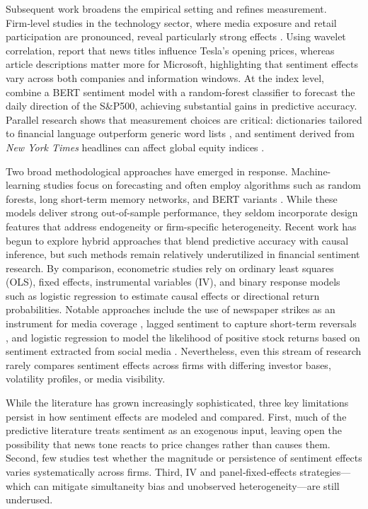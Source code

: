 \documentclass[12pt]{article}
\begin{document}
Subsequent work broadens the empirical setting and refines measurement. Firm‑level studies in the technology sector, where media exposure and retail participation are pronounced, reveal particularly strong effects \citep{cristescu2023wavelet}.  Using wavelet correlation, \citet{cristescu2023wavelet} report that news titles influence Tesla’s opening prices, whereas article descriptions matter more for Microsoft, highlighting that sentiment effects vary across both companies and information windows.  At the index level, \citet{fazlija2022bert} combine a BERT sentiment model with a random‑forest classifier to forecast the daily direction of the S\&P500, achieving substantial gains in predictive accuracy.  Parallel research shows that measurement choices are critical: dictionaries tailored to financial language outperform generic word lists \citep{xiao2023,loughran2011}, and sentiment derived from \textit{New York Times} headlines can affect global equity indices \citep{garcia2018nyt}.

Two broad methodological approaches have emerged in response.  Machine-learning studies focus on forecasting and often employ algorithms such as random forests, long short-term memory networks, and BERT variants \citep{patil2024sentiment,xiao2023}.  While these models deliver strong out-of-sample performance, they seldom incorporate design features that address endogeneity or firm-specific heterogeneity. Recent work has begun to explore hybrid approaches that blend predictive accuracy with causal inference, but such methods remain relatively underutilized in financial sentiment research. By comparison, econometric studies rely on ordinary least squares (OLS), fixed effects, instrumental variables (IV), and binary response models such as logistic regression to estimate causal effects or directional return probabilities.  Notable approaches include the use of newspaper strikes as an instrument for media coverage \citep{engelberg2011causal}, lagged sentiment to capture short-term reversals \citep{tetlock2007giving}, and logistic regression to model the likelihood of positive stock returns based on sentiment extracted from social media \citep{chen2014wisdom}.  Nevertheless, even this stream of research rarely compares sentiment effects across firms with differing investor bases, volatility profiles, or media visibility.

While the literature has grown increasingly sophisticated, three key limitations persist in how sentiment effects are modeled and compared. First, much of the predictive literature treats sentiment as an exogenous input, leaving open the possibility that news tone reacts to price changes rather than causes them.  Second, few studies test whether the magnitude or persistence of sentiment effects varies systematically across firms.  Third, IV and panel‑fixed‑effects strategies—which can mitigate simultaneity bias and unobserved heterogeneity—are still underused.
\end{document}
